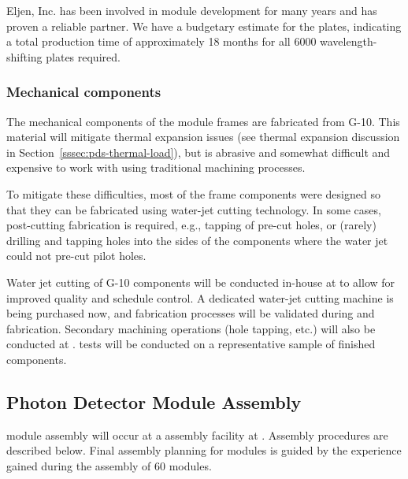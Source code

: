 Eljen, Inc. has been involved in  module development for many years and has proven a reliable partner.  We have a budgetary estimate for the plates, indicating a total production time of approximately \num{18} months for all \num{6000} wavelength-shifting plates required.

\subsubsection{Mechanical components}

The mechanical components of the  module frames are fabricated from
\frfour G-10. This material will mitigate thermal expansion issues (see thermal expansion discussion in Section~\ref{sssec:pds-thermal-load}),
but is abrasive and somewhat difficult and expensive to work with using traditional machining processes.

To mitigate these difficulties, most of the  frame components were designed so that they can be fabricated using water-jet cutting technology.  In some cases, post-cutting fabrication is required, e.g., tapping of pre-cut holes, or (rarely) drilling and tapping holes into the sides of the components where the water jet could not pre-cut pilot holes.

Water jet cutting of \frfour G-10 components will be conducted in-house at  to allow for improved quality and schedule control.  A dedicated water-jet cutting machine is being purchased now, and fabrication processes will be validated during  and  fabrication.  Secondary machining operations (hole tapping, etc.) will also be conducted at .   tests will be conducted on a representative sample of finished components.

\label{sec:fdsp-pd-prod-pc}

\subsection{Photon Detector Module Assembly}

  module assembly will occur at a  assembly facility at .  Assembly procedures are described below.  Final assembly planning for  modules is guided by the experience gained during the assembly of \num{60}   modules. 


